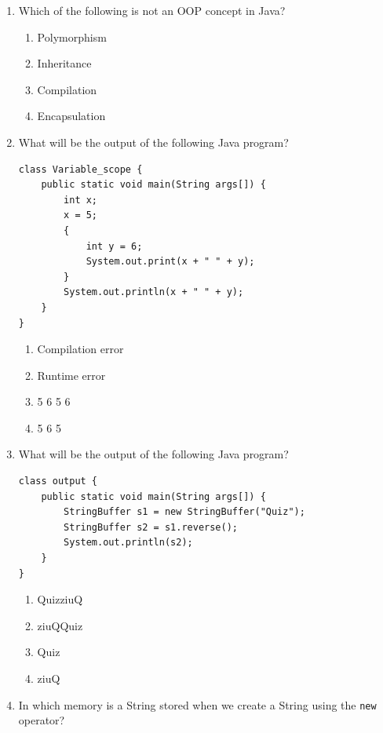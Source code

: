 \documentclass[11pt,a4paper]{article}
\begin{document}
\begin{enumerate}[label=(\roman*),leftmargin=*,itemsep=8pt]
  \item Which of the following is not an OOP concept in Java?
  
\begin{enumerate}[label=(\alph*),itemsep=2pt]
    \item Polymorphism
    \item Inheritance
    \item Compilation
    \item Encapsulation
  \end{enumerate}

  \item What will be the output of the following Java program?

\begin{lstlisting}
class Variable_scope {
    public static void main(String args[]) {
        int x;
        x = 5;
        {
            int y = 6;
            System.out.print(x + " " + y);
        }
        System.out.println(x + " " + y);
    }
}
\end{lstlisting}
  
\begin{enumerate}[label=(\alph*),itemsep=2pt]
    \item Compilation error
    \item Runtime error
    \item 5 6 5 6
    \item 5 6 5
  \end{enumerate}

  \item What will be the output of the following Java program?

\begin{lstlisting}
class output {
    public static void main(String args[]) {
        StringBuffer s1 = new StringBuffer("Quiz");
        StringBuffer s2 = s1.reverse();
        System.out.println(s2);
    }
}
\end{lstlisting}
  
\begin{enumerate}[label=(\alph*),itemsep=2pt]
    \item QuizziuQ
    \item ziuQQuiz
    \item Quiz
    \item ziuQ
  \end{enumerate}

  \item In which memory is a String stored when we create a String using the   \texttt{new} operator?
  

\end{enumerate}
\end{document}
